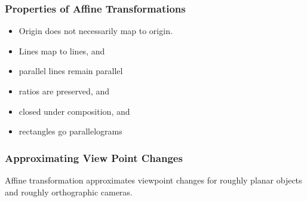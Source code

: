 \documentclass[11pt]{article}
\begin{document}
\subsubsection{Properties of Affine Transformations}
\begin{itemize}
	\item {\color{Orange} Origin does not necessarily map to origin. }
	\item Lines map to lines, and
	\item parallel lines remain parallel
	\item ratios are preserved, and 
	\item closed under composition, and 
	\item rectangles go parallelograms
\end{itemize}

\subsubsection{Approximating View Point Changes}
Affine transformation approximates viewpoint changes for roughly planar objects and roughly orthographic cameras. 
\end{document}
